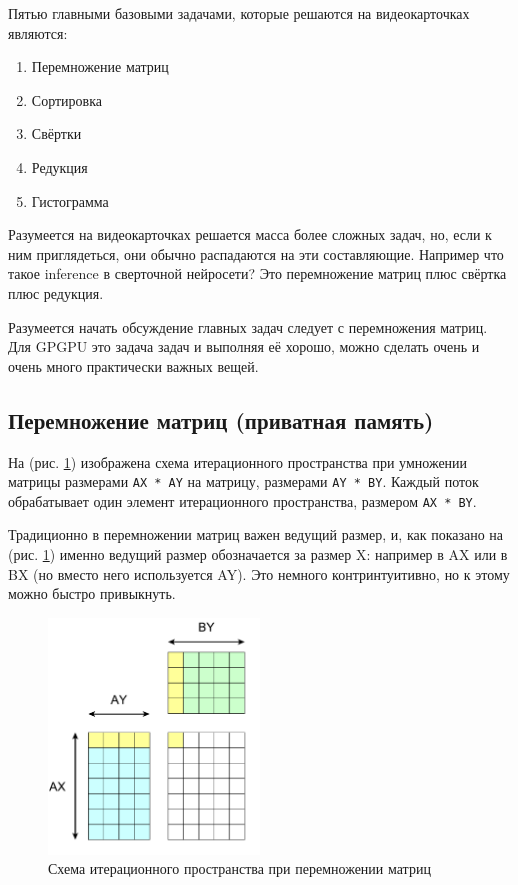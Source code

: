 \documentclass[a4paper,12pt,oneside]{article}
\begin{document}
Пятью главными базовыми задачами, которые решаются на видеокарточках являются:

\begin{enumerate}
\item Перемножение матриц
\item Сортировка
\item Свёртки
\item Редукция
\item Гистограмма
\end{enumerate}

Разумеется на видеокарточках решается масса более сложных задач, но, если к ним приглядеться, они обычно распадаются на эти составляющие.
Например что такое inference в сверточной нейросети?
Это перемножение матриц плюс свёртка плюс редукция.

Разумеется начать обсуждение главных задач следует с перемножения матриц.
Для GPGPU это задача задач и выполняя её хорошо, можно сделать очень и очень много практически важных вещей.

\subsection{Перемножение матриц (приватная память)}\label{subsec:gemm}

На (рис. \ref{fig:iterspace}) изображена схема итерационного пространства при умножении матрицы размерами \lstinline!AX * AY! на матрицу, размерами \lstinline!AY * BY!. Каждый поток обрабатывает один элемент итерационного пространства, размером \lstinline!AX * BY!.

Традиционно в перемножении матриц важен ведущий размер, и, как показано на (рис. \ref{fig:iterspace}) именно ведущий размер обозначается за размер X: например в AX или в BX (но вместо него используется AY).
Это немного контринтуитивно, но к этому можно быстро привыкнуть.

\begin{figure}
\centering
\includegraphics[width=0.5\textwidth]{pictures/iter-space-matrix-single.pdf}
\caption{Схема итерационного пространства при перемножении матриц}
\label{fig:iterspace}
\end{figure}
\end{document}
